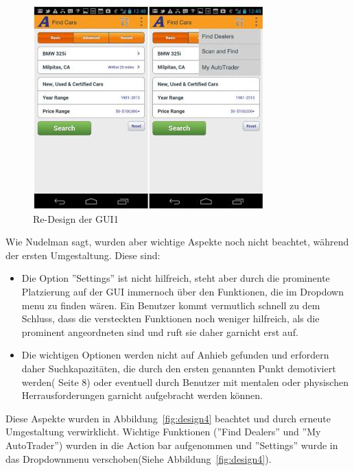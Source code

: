 \begin{figure}[h]
 \centering
 \includegraphics[height=0.40\textheight]{img/Design3.png}
 \caption{Re-Design der GUI1}
 \label{fig:design3}
\end{figure}

Wie Nudelman sagt, wurden aber wichtige Aspekte noch nicht beachtet, während der ersten Umgestaltung. Diese sind:
\begin{itemize}
\item Die Option ''Settings'' ist nicht hilfreich, steht aber durch die prominente Platzierung auf der GUI immernoch über den Funktionen, die im Dropdown menu zu finden wären. Ein Benutzer kommt vermutlich schnell zu dem Schluss, dass die versteckten Funktionen noch weniger hilfreich, als die prominent angeordneten sind und ruft sie daher garnicht erst auf.
\item Die wichtigen Optionen werden nicht auf Anhieb gefunden und erfordern daher Suchkapazitäten, die durch den ersten genannten Punkt demotiviert werden(\cite{AndroidDesignPatterns} Seite 8) oder eventuell durch Benutzer mit mentalen oder physischen Herrausforderungen garnicht aufgebracht werden können.
\end{itemize}
\newline

Diese Aspekte wurden in Abbildung~\ref{fig:design4} beachtet und durch erneute Umgestaltung verwirklicht. Wichtige Funktionen (''Find Dealers'' und ''My AutoTrader'') wurden in die Action bar aufgenommen und ''Settings'' wurde in das Dropdownmenu verschoben(Siehe Abbildung~\ref{fig:design4}).

